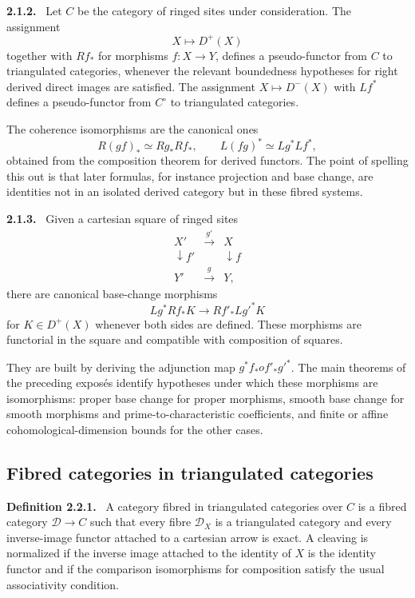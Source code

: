\documentclass[12pt]{article}
\newenvironment{statement}[1]{\par\medskip\noindent\textbf{#1.}\ }{\par\medskip}
\begin{document}
\begin{statement}{2.1.2}
Let \(C\) be the category of ringed sites under consideration. The assignment
\[
X\longmapsto D^+(X)
\]
together with \(Rf_*\) for morphisms \(f:X\to Y\), defines a pseudo-functor from \(C\) to triangulated categories, whenever the relevant boundedness hypotheses for right derived direct images are satisfied. The assignment \(X\mapsto D^-(X)\) with \(Lf^*\) defines a pseudo-functor from \(C^{\circ}\) to triangulated categories.
\end{statement}

The coherence isomorphisms are the canonical ones
\[
R(gf)_*\simeq Rg_*Rf_* ,
\qquad
L(fg)^*\simeq Lg^*Lf^*,
\]
obtained from the composition theorem for derived functors. The point of spelling this out is that later formulas, for instance projection and base change, are identities not in an isolated derived category but in these fibred systems.

\begin{statement}{2.1.3}
Given a cartesian square of ringed sites
\[
\begin{array}{ccc}
X'&\xrightarrow{g'}&X\\
\downarrow f'&&\downarrow f\\
Y'&\xrightarrow{g}&Y,
\end{array}
\]
there are canonical base-change morphisms
\[
Lg^*Rf_*K\longrightarrow Rf'_*Lg'^*K
\]
for \(K\in D^+(X)\) whenever both sides are defined. These morphisms are functorial in the square and compatible with composition of squares.
\end{statement}

They are built by deriving the adjunction map \(g^*f_*	o f'_*g'^*\). The main theorems of the preceding expos\'es identify hypotheses under which these morphisms are isomorphisms: proper base change for proper morphisms, smooth base change for smooth morphisms and prime-to-characteristic coefficients, and finite or affine cohomological-dimension bounds for the other cases.

\subsection{Fibred categories in triangulated categories}

\begin{statement}{Definition 2.2.1}
A category fibred in triangulated categories over \(C\) is a fibred category \(\mathcal D\to C\) such that every fibre \(\mathcal D_X\) is a triangulated category and every inverse-image functor attached to a cartesian arrow is exact. A cleaving is normalized if the inverse image attached to the identity of \(X\) is the identity functor and if the comparison isomorphisms for composition satisfy the usual associativity condition.
\end{statement}
\end{document}
